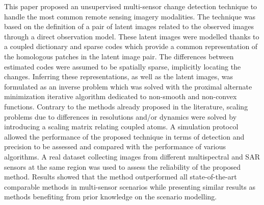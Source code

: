 \documentclass[review]{elsarticle}
\begin{document}
This paper proposed an unsupervised multi-sensor change detection technique to handle the most common remote sensing imagery modalities. The technique was based on the definition of a pair of latent images related to the observed images through a direct observation model. These latent images were modelled thanks to a coupled dictionary and sparse codes which provide a common representation of the homologous patches in the latent image pair. The differences between estimated codes were assumed to be spatially sparse, implicitly locating the changes. Inferring these representations, as well as the latent images, was formulated as an inverse problem which was solved with the proximal alternate minimization iterative algorithm dedicated to non-smooth and non-convex functions. Contrary to the methods already proposed in the literature, scaling problems due to differences in resolutions and/or dynamics were solved by introducing a scaling matrix relating coupled atoms. A simulation protocol allowed the performance of the proposed technique in terms of detection and precision to be assessed and compared with the performance of various algorithms. A real dataset collecting images from different multispectral and  SAR sensors at the same region was used to assess the reliability of the proposed method. Results showed that the method outperformed all state-of-the-art comparable methods in multi-sensor scenarios while presenting similar results as methods benefiting from prior knowledge on the scenario modelling.
\end{document}
